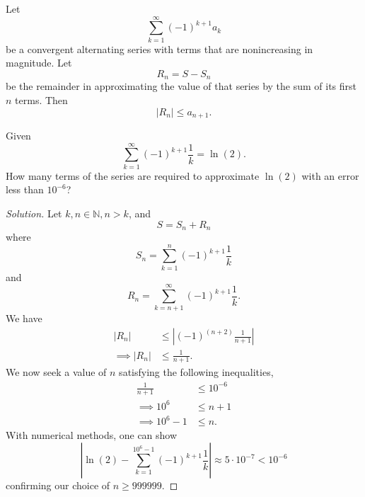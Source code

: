 \documentclass[compacto,10pt,comentarios]{aleph-notas}
\begin{document}
\begin{teo}
    Let
    $$
        \sum_{k=1}^{\infty} (-1)^{k+1} a_k
    $$
    be a convergent alternating series with terms that are nonincreasing in magnitude. Let
    $$
        R_n = S - S_n
    $$
    be the remainder in approximating the value of that series by the sum of its first $n$ terms.
    Then
    $$
        |R_n| \leq a_{n+1}.
    $$
\end{teo}

\begin{ejer}
    Given
    $$
        \sum_{k=1}^{\infty} (-1)^{k+1} \frac{1}{k} = \ln(2).
    $$
    How many terms of the series are required to approximate $\ln(2)$ with an error less than $10^{-6}$?
\end{ejer}
\begin{proof}[Solution]
    Let $k, n \in \mathbb{N}, n > k$, and
    $$
        S = S_{n} + R_{n}
    $$
    where
    $$
        S_{n} = \sum_{k=1}^{n} (-1)^{k+1} \frac{1}{k}
    $$
    and
    $$
        R_{n} = \sum_{k=n+1}^{\infty} (-1)^{k+1} \frac{1}{k}.
    $$
    We have
    \begin{align*}
        |R_{n}| & \leq \left|(-1)^{(n+2)} \frac{1}{n + 1} \right| \\
        \implies |R_{n}| & \leq \frac{1}{n+1}.
    \end{align*}
    We now seek a value of $n$ satisfying the following inequalities,
    \begin{align*}
        \frac{1}{n+1} & \leq 10^{-6} \\
        \implies 10^{6} & \leq n + 1 \\
        \implies 10^{6} - 1 & \leq n.
    \end{align*}
    With numerical methods, one can show
    $$
        \left| \ln(2) - \sum_{k=1}^{10^{6} - 1} (-1)^{k+1} \frac{1}{k} \right| \approx 5 \cdot 10^{-7} < 10^{-6}
    $$
    confirming our choice of $n \geq 999999$.
\end{proof}
\end{document}
